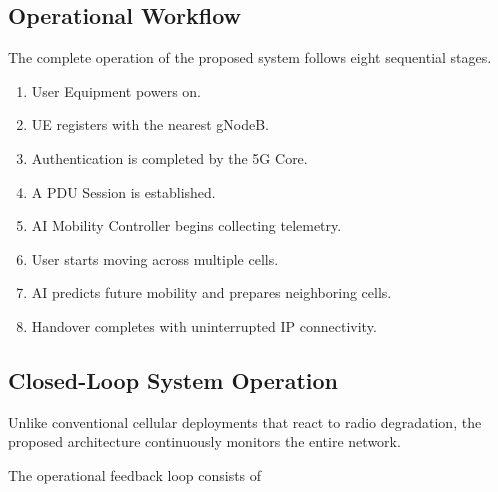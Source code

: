 \documentclass[12pt,a4paper]{article}\usepackage[a4paper,margin=1in]{geometry}\usepackage{graphicx}\usepackage{longtable}\usepackage{booktabs}\usepackage{hyperref}\usepackage{enumitem}\usepackage{amsmath}\usepackage{tikz}\usepackage{pgfgantt}\usepackage{setspace}\setstretch{1.15}\usetikzlibrary{positioning,arrows.meta,shapes.geometric}
\begin{document}
	\subsection{Operational Workflow}
	
	The complete operation of the proposed system follows eight sequential stages.
	
	\begin{enumerate}
		
		\item User Equipment powers on.
		
		\item UE registers with the nearest gNodeB.
		
		\item Authentication is completed by the 5G Core.
		
		\item A PDU Session is established.
		
		\item AI Mobility Controller begins collecting telemetry.
		
		\item User starts moving across multiple cells.
		
		\item AI predicts future mobility and prepares neighboring cells.
		
		\item Handover completes with uninterrupted IP connectivity.
		
	\end{enumerate}
	
	
	\subsection{Closed-Loop System Operation}
	
	Unlike conventional cellular deployments that react to radio degradation, the proposed architecture continuously monitors the entire network.
	
	The operational feedback loop consists of
	
\end{document}
